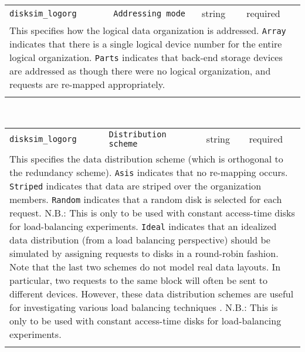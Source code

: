\noindent 
\begin{tabular}{|p{\lpmodwidth}|p{\lpnamewidth}|p{0.5in}|p{0.5in}|}
\cline{1-4}
\texttt{disksim\_logorg} & \texttt{Addressing mode} & string & required \\ 
\cline{1-4}
\multicolumn{4}{|p{6in}|}{
This specifies how the logical data organization is addressed.
\texttt{Array} indicates that there is a single logical device number for
the entire logical organization.
\texttt{Parts} indicates that back-end storage devices are addressed as
though there were no logical organization, and requests are re-mapped
appropriately.
}\\ 
\cline{1-4}
\multicolumn{4}{p{5in}}{}\\
\end{tabular}\\ 
\noindent 
\begin{tabular}{|p{\lpmodwidth}|p{\lpnamewidth}|p{0.5in}|p{0.5in}|}
\cline{1-4}
\texttt{disksim\_logorg} & \texttt{Distribution scheme} & string & required \\ 
\cline{1-4}
\multicolumn{4}{|p{6in}|}{
This specifies the data distribution scheme (which is orthogonal to
the redundancy scheme).
\texttt{Asis} indicates that no re-mapping occurs.
\texttt{Striped} indicates that data are striped over the organization
members.
\texttt{Random} indicates that a random disk is selected for each request.
N.B.: This is only to be used with constant access-time disks
for load-balancing experiments.
\texttt{Ideal} indicates that an idealized data distribution (from a load
balancing perspective) should be simulated by assigning requests to
disks in a round-robin fashion. Note that the last two schemes do not
model real data layouts. In particular, two requests to the same
block will often be sent to different devices. However, these data
distribution schemes are useful for investigating various load
balancing techniques \cite{Ganger93a}.
N.B.: This is only to be used with constant access-time disks
for load-balancing experiments.
}\\ 
\cline{1-4}
\multicolumn{4}{p{5in}}{}\\
\end{tabular}\\ 
\noindent 
